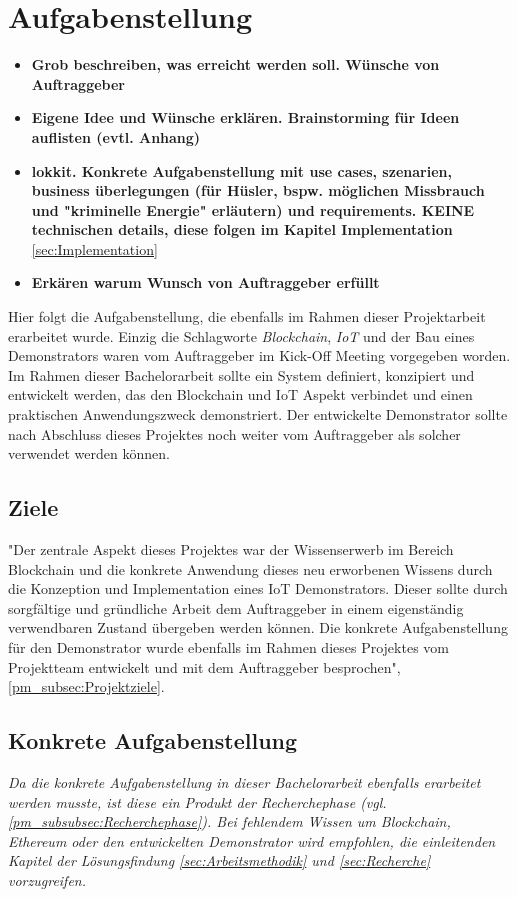 \chapter{Aufgabenstellung}
\label{cha:Aufgabenstellung}
\begin{itemize}
    \item \textbf{Grob beschreiben, was erreicht werden soll. Wünsche von Auftraggeber}
    \item \textbf{Eigene Idee und Wünsche erklären. Brainstorming für Ideen auflisten (evtl. Anhang)}
    \item \textbf{lokkit. Konkrete Aufgabenstellung mit use cases, szenarien, business überlegungen (für Hüsler, bspw. möglichen Missbrauch und "kriminelle Energie" erläutern) und requirements. KEINE technischen details, diese folgen im Kapitel Implementation} \ref{sec:Implementation}
    \item \textbf{Erkären warum Wunsch von Auftraggeber erfüllt}
\end{itemize}

Hier folgt die Aufgabenstellung, die ebenfalls im Rahmen dieser Projektarbeit erarbeitet wurde. Einzig die Schlagworte \emph{Blockchain}, \emph{\acrfull{IoT}} und der Bau eines Demonstrators waren vom Auftraggeber im Kick-Off Meeting vorgegeben worden. Im Rahmen dieser Bachelorarbeit sollte ein System definiert, konzipiert und entwickelt werden, das den Blockchain und IoT Aspekt verbindet und einen praktischen Anwendungszweck demonstriert. Der entwickelte Demonstrator sollte nach Abschluss dieses Projektes noch weiter vom Auftraggeber als solcher verwendet werden können.

\section{Ziele}
\label{sec:Ziele}
"Der zentrale Aspekt dieses Projektes war der Wissenserwerb im Bereich Blockchain und die konkrete Anwendung dieses neu erworbenen Wissens durch die Konzeption und Implementation eines IoT Demonstrators. Dieser sollte durch sorgfältige und gründliche Arbeit dem Auftraggeber in einem eigenständig verwendbaren Zustand übergeben werden können. Die konkrete Aufgabenstellung für den Demonstrator wurde ebenfalls im Rahmen dieses Projektes vom Projektteam entwickelt und mit dem Auftraggeber besprochen", \ref{pm_subsec:Projektziele}.

\section{Konkrete Aufgabenstellung}
\label{sec:Konkrete_Aufgabenstellung}
\emph{Da die konkrete Aufgabenstellung in dieser Bachelorarbeit ebenfalls erarbeitet werden musste, ist diese ein Produkt der Recherchephase (vgl. \ref{pm_subsubsec:Recherchephase}). Bei fehlendem Wissen um Blockchain, Ethereum oder den entwickelten Demonstrator wird empfohlen, die einleitenden Kapitel der Lösungsfindung \ref{sec:Arbeitsmethodik} und \ref{sec:Recherche} vorzugreifen.}

